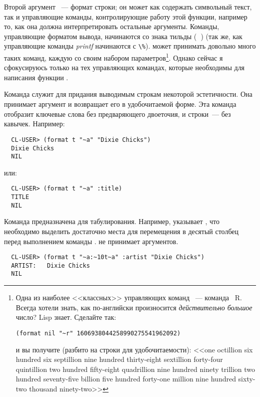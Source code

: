 Второй аргумент ~--- формат строки; он может как содержать символьный текст,
так и управляющие команды, контролирующие работу этой функции, например то, как она должна
интерпретировать остальные аргументы. Команды, управляющие форматом вывода, начинаются со
знака тильды (\textbf{~}) (так же, как управляющие команды \textit{printf} начинаются с
\lstinline{\%}).  может принимать довольно много таких команд, каждую со
своим набором параметров\footnote{Одна из наиболее <<классных>> управляющих команд
  ~--- команда ~R. Всегда хотели знать, как по-английски произносится
  \textit{действительно большое} число? Lisp знает. Сделайте так:

\begin{lstlisting}
(format nil "~r" 1606938044258990275541962092)
\end{lstlisting}

и вы получите (разбито на строки для удобочитаемости): <<one octillion six hundred six
septillion nine hundred thirty-eight sextillion forty-four quintillion two hundred
fifty-eight quadrillion nine hundred ninety trillion two hundred seventy-five billion five
hundred forty-one million nine hundred sixty-two thousand ninety-two>>}. Однако сейчас я
сфокусируюсь только на тех управляющих командах, которые необходимы для написания функции
.

Команда  служит для придания выводимым строкам некоторой эстетичности. Она
принимает аргумент и возвращает его в удобочитаемой форме. Эта команда отобразит ключевые
слова без предваряющего двоеточия, и строки~--- без кавычек. Например:

\begin{verbatim}
  CL-USER> (format t "~a" "Dixie Chicks")
  Dixie Chicks
  NIL
\end{verbatim}

или:

\begin{verbatim}
  CL-USER> (format t "~a" :title)
  TITLE
  NIL
\end{verbatim}

Команда  предназначена для табулирования. Например,  указывает
, что необходимо выделить достаточно места для перемещения в десятый столбец
перед выполнением команды .  не принимает аргументов.

\begin{verbatim}
  CL-USER> (format t "~a:~10t~a" :artist "Dixie Chicks")
  ARTIST:   Dixie Chicks
  NIL
\end{verbatim}

